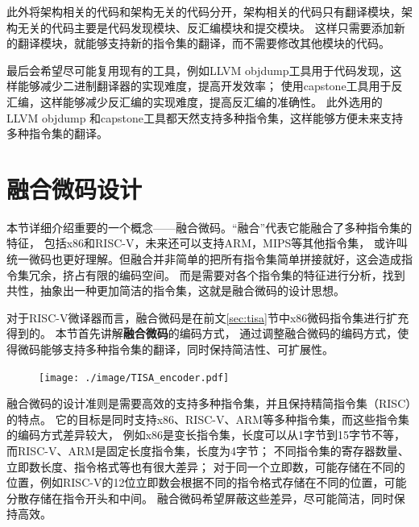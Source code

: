 此外将架构相关的代码和架构无关的代码分开，架构相关的代码只有翻译模块，架构无关的代码主要是代码发现模块、反汇编模块和提交模块。
这样只需要添加新的翻译模块，就能够支持新的指令集的翻译，而不需要修改其他模块的代码。

最后会希望尽可能复用现有的工具，例如LLVM objdump工具用于代码发现，这样能够减少二进制翻译器的实现难度，提高开发效率；
使用capstone工具用于反汇编，这样能够减少反汇编的实现难度，提高反汇编的准确性。
此外选用的LLVM objdump 和capstone工具都天然支持多种指令集，这样能够方便未来支持多种指令集的翻译。




\section{融合微码设计}

本节详细介绍重要的一个概念——融合微码。“融合”代表它能融合了多种指令集的特征，
包括x86和RISC-V，未来还可以支持ARM，MIPS等其他指令集，
或许叫统一微码也更好理解。但融合并非简单的把所有指令集简单拼接就好，这会造成指令集冗余，挤占有限的编码空间。
而是需要对各个指令集的特征进行分析，找到共性，抽象出一种更加简洁的指令集，这就是融合微码的设计思想。

对于RISC-V微译器而言，融合微码是在前文\ref{sec:tisa}节中x86微码指令集进行扩充得到的。
本节首先讲解\textbf{融合微码}的编码方式，
通过调整融合微码的编码方式，使得微码能够支持多种指令集的翻译，同时保持简洁性、可扩展性。

\begin{figure}[!htbp]
  \centering
  \texttt{[image: ./image/TISA\_encoder.pdf]}
  \label{img:TISA_encoder}
\end{figure}

融合微码的设计准则是需要高效的支持多种指令集，并且保持精简指令集（RISC）的特点。
它的目标是同时支持x86、RISC-V、ARM等多种指令集，而这些指令集的编码方式差异较大，
例如x86是变长指令集，长度可以从1字节到15字节不等，而RISC-V、ARM是固定长度指令集，长度为4字节；
不同指令集的寄存器数量、立即数长度、指令格式等也有很大差异；
对于同一个立即数，可能存储在不同的位置，例如RISC-V的12位立即数会根据不同的指令格式存储在不同的位置，可能分散存储在指令开头和中间。
融合微码希望屏蔽这些差异，尽可能简洁，同时保持高效。

